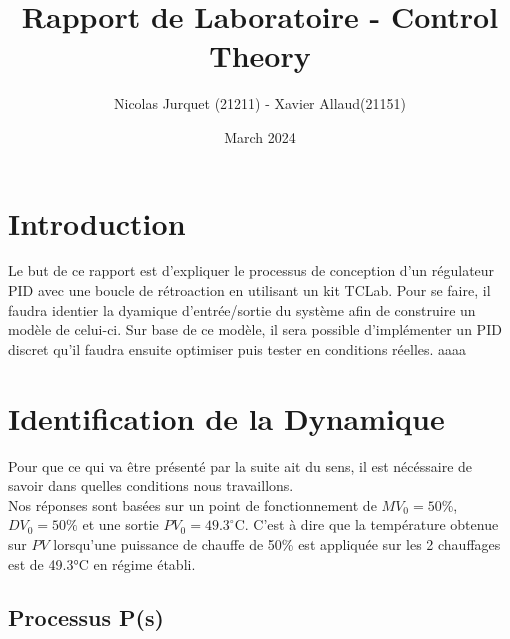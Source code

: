 \documentclass{article}
\title{Rapport de Laboratoire - Control Theory}
\author{Nicolas Jurquet (21211) - Xavier Allaud(21151)}
\date{March 2024}
\begin{document}
\maketitle

\section{Introduction}
Le but de ce rapport est d'expliquer le processus de conception d'un régulateur PID avec une boucle de rétroaction en utilisant un kit TCLab. Pour se faire, il faudra identier la dyamique d'entrée/sortie du système afin de construire un modèle de celui-ci. Sur base de ce modèle, il sera possible d'implémenter un PID discret qu'il faudra ensuite optimiser puis tester en conditions réelles.
aaaa
\tableofcontents

\newpage

\section{Identification de la Dynamique}
Pour que ce qui va être présenté par la suite ait du sens, il est nécéssaire de savoir dans quelles conditions nous travaillons.\\
Nos réponses sont basées sur un point de fonctionnement de $MV_0 = 50\%$, $DV_0 = 50\%$ et une sortie $PV_0 = 49.3^{\circ}$C. 
C'est à dire que la température obtenue sur $PV$ lorsqu'une puissance de chauffe de 50\% est appliquée sur les 2 chauffages est de 49.3°C en régime établi.

\subsection{Processus P(s)}
\end{document}

